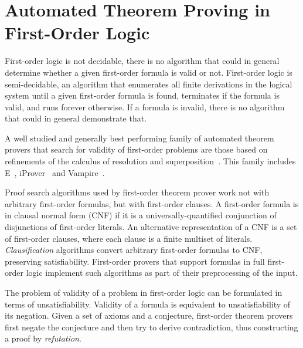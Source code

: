 \section*{Automated Theorem Proving in First-Order Logic}

First-order logic is not decidable, there is no algorithm that could in general determine whether a given first-order formula is valid or not. First-order logic is semi-decidable, an algorithm that enumerates all finite derivations in the logical system until a given first-order formula is found, terminates if the formula is valid, and runs forever otherwise. If a formula is invalid, there is no algorithm that could in general demonstrate that.

A well studied and generally best performing family of automated theorem provers that search for validity of first-order problems are those based on refinements of the calculus of resolution and superposition~\cite{NieuwenhuisRubio:HandbookAR:paramodulation:2001}. This family includes E~\cite{E13}, iProver~\cite{iProver} and Vampire~\cite{Vampire13}. %


Proof search algorithms used by first-order theorem prover work not with arbitrary first-order formulas, but with first-order clauses. A first-order formula is in clausal normal form (CNF) if it is a universally-quantified conjunction of disjunctions of first-order literals. An alternative representation of a CNF is a set of first-order clauses, where each clause is a finite multiset of literals. \emph{Clausification} algorithms convert arbitrary first-order formulas to CNF, preserving satisfiability. First-order provers that support formulas in full first-order logic implement such algorithms as part of their preprocessing of the input.

The problem of validity of a problem in first-order logic can be formulated in terms of unsatisfiability. Validity of a formula is equivalent to unsatisfiability of its negation. Given a set of axioms and a conjecture, first-order theorem provers first negate the conjecture and then try to derive contradiction, thus constructing a proof by \emph{refutation}.

